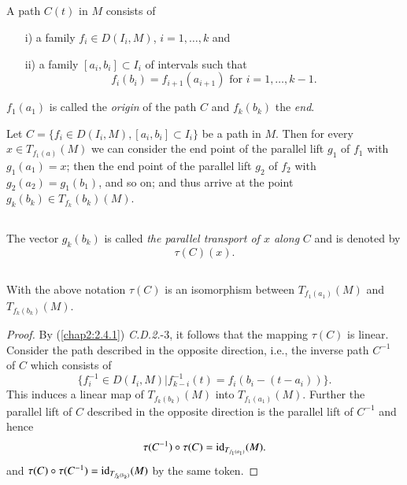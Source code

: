\subsection{}\label{chap2:2.7.5}

\begin{defi*}
A path $C(t)$ in $M$ consists of
\begin{itemize}
\item[i)] a family $f_{i}\in D(I_{i},M)$, $i=1,\ldots,k$ and

\item[ii)] a family $[a_{i},b_{i}]\subset I_{i}$ of intervals such
  that
$$
f_{i}(b_{i})=f_{i+1}(a_{i+1})\text{ \ for \ } i=1,\ldots, k-1.
$$
\end{itemize}
$f_{1}(a_{1})$ is called the {\em origin} of the path $C$ and
$f_{k}(b_{k})$ the {\em end}. 
\end{defi*}

Let $C=\{f_{i}\in D(I_{i},M),[a_{i},b_{i}]\subset I_{i}\}$ be a path
in $M$. Then for every $x\in T_{f_{1}(a)}(M)$ we can consider the end
point of the parallel lift \pageoriginale $g_{1}$ of $f_{1}$ with
$g_{1}(a_{1})=x$; then the end point of the parallel lift $g_{2}$ of
$f_{2}$ with $g_{2}(a_{2})=g_{1}(b_{1})$, and so on; and thus arrive
at the point $g_{k}(b_{k})\in T_{f_{k}}(b_{k})(M)$.

\setcounter{subsection}{5}
\subsection{}\label{chap2:2.7.6}
The vector $g_{k}(b_{k})$ is called {\em the parallel transport of $x$
  along} $C$ and is denoted by
$$
\tau(C)(x).
$$

\subsection{}\label{chap2:prop2.7.7}

\begin{prop*}
With the above notation $\tau(C)$ is an isomorphism between
$T_{f_{1}(a_{1})}(M)$ and $T_{f_{k}(b_{k})}(M)$.
\end{prop*}

\begin{proof}
By (\ref{chap2:2.4.1}) {\em C.D.2.}-3, it follows that the mapping $\tau(C)$
is linear. Consider the path described in the opposite direction,
i.e., the inverse path $C^{-1}$ of $C$ which consists of
$$
\{f^{-1}_{i}\in D(I_{i},M)|f^{-1}_{k-i}(t)=f_{i}(b_{i}-(t-a_{i}))\}.
$$
This induces a linear map of $T_{f_{k}(b_{k})}(M)$ into
$T_{f_{1}(a_{1})}(M)$. Further the parallel lift of $C$ described in
the opposite direction is the parallel lift of $C^{-1}$ and hence
$$
\tau(C^{-1})\circ \tau(C)=\operatorname{id}_{T_{f_{1}(a_{1})}}(M).
$$
and $\tau(C)\circ \tau(C^{-1})=\operatorname{id}_{T_{f_{k}(b_{k})}}(M)$ by the same token.
\end{proof}

